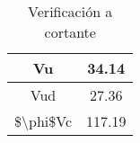 \begin{table}[H]
  \centering
    \begin{tabular}{|c|c|}
    \hline
    \rowcolor[rgb]{ .2,  .247,  .31} \textcolor[rgb]{ 1,  1,  1}{Vu} & \cellcolor[rgb]{ 1,  1,  1}34.14 \bigstrut\\
    \hline
    \rowcolor[rgb]{ .2,  .247,  .31} \textcolor[rgb]{ 1,  1,  1}{Vud} & \cellcolor[rgb]{ 1,  1,  1}27.36 \bigstrut\\
    \hline
    \rowcolor[rgb]{ .2,  .247,  .31} \textcolor[rgb]{ 1,  1,  1}{\$\textbackslash{}phi\$Vc} & \cellcolor[rgb]{ 1,  1,  1}117.19 \bigstrut\\
\cline{2-2}    \end{tabular}%
  \caption{Verificación a cortante}
  \label{tab:Cortante losa}%
\end{table}%
